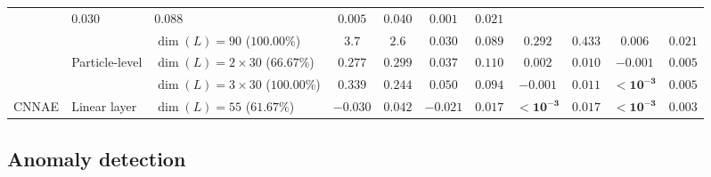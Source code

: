 \begin{table}[ht!]
{\begin{tabular}{lllcccccccc}
         & $\mathit{0.030}$ & $\mathit{0.088}$
         & $\mathit{0.005}$ & $\mathit{0.040}$
         & $\mathit{0.001}$ & ${0.021}$
        \\
         & & $\dim(L) = 90$ ($100.00\%$)
         & ${3.7}$ & $2.6$
         & $\mathit{0.030}$ & ${0.089}$
         & ${0.292}$ & ${0.433}$
         & ${0.006}$ & ${0.021}$
        \\[1mm]
         & \multirow{2}{*}{Particle-level}
         & $\dim(L) = 2 \times 30$ ($66.67\%$)
         & $\mathit{0.277}$ & ${0.299}$
         & $\mathit{0.037}$ & ${0.110}$
         & ${0.002}$ & $\mathit{0.010}$
         & $-0.001$ & ${0.005}$
        \\
         & & $\dim(L) = 3 \times 30$ ($100.00\%$)
         & ${0.339}$ & $\mathit{0.244}$
         & ${0.050}$ & $\mathit{0.094}$
         & $\mathit{-0.001}$ & ${0.011}$
         & $\mathbf{<10^{-3}}$ & ${0.005}$
        \\[2mm]
        CNNAE 
        & Linear layer
        & $\dim(L) = 55$ ($61.67\%$) 
        & $-0.030$
        & $0.042$ 
        & $-0.021$
        & $0.017$
        & $\mathbf{< 10^{-3}}$
        & $0.017$
        & $\mathbf{<10^{-3}}$
        & $0.003$ \\
        \bottomrule
    \end{tabular}
    }
\end{table}

\clearpage
\subsection{Anomaly detection}
\label{sec:06_lgae_anomaly}


